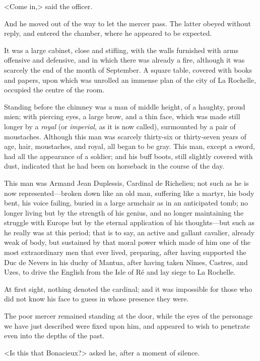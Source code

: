 <Come in,> said the officer. 

And he moved out of the way to let the mercer pass. The latter obeyed without reply, and entered the chamber, where he appeared to be expected. 

It was a large cabinet, close and stifling, with the walls furnished with arms offensive and defensive, and in which there was already a fire, although it was scarcely the end of the month of September. A square table, covered with books and papers, upon which was unrolled an immense plan of the city of La Rochelle, occupied the centre of the room. 

Standing before the chimney was a man of middle height, of a haughty, proud mien; with piercing eyes, a large brow, and a thin face, which was made still longer by a \textit{royal} (or \textit{imperial}, as it is now called), surmounted by a pair of moustaches. Although this man was scarcely thirty-six or thirty-seven years of age, hair, moustaches, and royal, all began to be gray. This man, except a sword, had all the appearance of a soldier; and his buff boots, still slightly covered with dust, indicated that he had been on horseback in the course of the day. 

This man was Armand Jean Duplessis, Cardinal de Richelieu; not such as he is now represented---broken down like an old man, suffering like a martyr, his body bent, his voice failing, buried in a large armchair as in an anticipated tomb; no longer living but by the strength of his genius, and no longer maintaining the struggle with Europe but by the eternal application of his thoughts---but such as he really was at this period; that is to say, an active and gallant cavalier, already weak of body, but sustained by that moral power which made of him one of the most extraordinary men that ever lived, preparing, after having supported the Duc de Nevers in his duchy of Mantua, after having taken Nîmes, Castres, and Uzes, to drive the English from the Isle of Ré and lay siege to La Rochelle. 

At first sight, nothing denoted the cardinal; and it was impossible for those who did not know his face to guess in whose presence they were. 

The poor mercer remained standing at the door, while the eyes of the personage we have just described were fixed upon him, and appeared to wish to penetrate even into the depths of the past. 

<Is this that Bonacieux?> asked he, after a moment of silence. 

